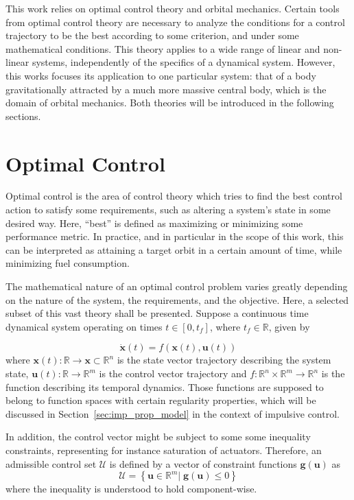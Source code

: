 
This work relies on optimal control theory and orbital mechanics. Certain tools from optimal control theory are necessary to analyze the conditions for a control trajectory to be the best according to some criterion, and under some mathematical conditions. This theory applies to a wide range of linear and non-linear systems, independently of the specifics of a dynamical system. However, this works focuses its application to one particular system: that of a body gravitationally attracted by a much more massive central body, which is the domain of orbital mechanics. Both theories will be introduced in the following sections.

\section{Optimal Control}

Optimal control is the area of control theory which tries to find the best control action to satisfy some requirements, such as altering a system's state in some desired way. Here, ``best''  is defined as maximizing or minimizing some performance metric. In practice, and in particular in the scope of this work, this can be interpreted as attaining a target orbit in a certain amount of time, while minimizing fuel consumption.

The mathematical nature of an optimal control problem varies greatly depending on the nature of the system, the requirements, and the objective. Here, a selected subset of this vast theory shall be presented. Suppose a continuous time dynamical system operating on times \(t \in [0, t_f]\), where \(t_f \in \mathbb{R}\), given by

\begin{equation} \label{eq:generic_dyn}
    \dot{\mathbf{x}}(t) = f(\mathbf{x}(t), \mathbf{u}(t))
\end{equation}
where \(\mathbf{x}(t): \mathbb{R} \rightarrow \mathcal{\mathbf{x}} \subset \mathbb{R}^n\) is the state vector trajectory describing the system state, \(\mathbf{u}(t): \mathbb{R} \rightarrow \mathbb{R}^m\) is the control vector trajectory and \(f: \mathbb{R}^n \times \mathbb{R}^m \rightarrow \mathbb{R}^n\) is the function describing its temporal dynamics. Those functions are supposed to belong to function spaces with certain regularity properties, which will be discussed in Section~\ref{sec:imp_prop_model} in the context of impulsive control.

In addition, the control vector might be subject to some some inequality constraints, representing for instance saturation of actuators. Therefore, an admissible control set \(\mathcal{U}\) is defined by a vector of constraint functions \(\mathbf{g}(\mathbf{u})\) as
\begin{equation}
    \mathcal{U} = \left\{\mathbf{u} \in \mathbb{R}^m |\; \mathbf{g}(\mathbf{u}) \leq 0\right\}
\end{equation}
where the inequality is understood to hold component-wise.


